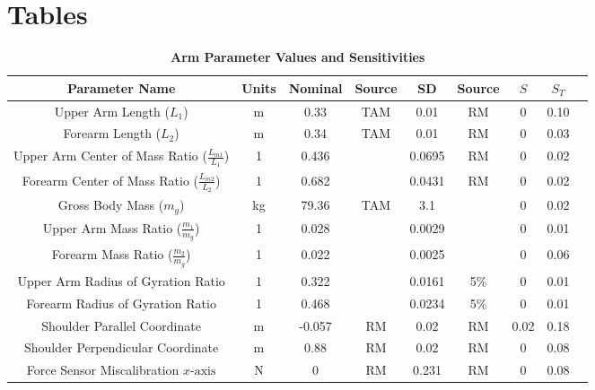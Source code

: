\documentclass[10pt]{article}
\begin{document}
\section*{Tables}

\begin{table}[!ht]
\caption{
\bf{Arm Parameter Values and Sensitivities}}
\begin{tabular}{|c|c|c c|c c|c c|c|}
\hline
Parameter Name &
Units &
Nominal &
Source &
SD &
Source &
$S$ &
$S_T$ \\ \hline
Upper Arm Length ($L_1$) &
m &
0.33 &
TAM &
0.01 &
RM &
0 &
0.10 \\
Forearm Length ($L_2$) &
m &
0.34 &
TAM &
0.01 &
RM &
0 &
0.03 \\
Upper Arm Center of Mass Ratio ($\frac{L_{m1}}{L_1}$) &
1 &
0.436 &
\cite{winter2009biomechanics} &
0.0695 &
RM &
0 &
0.02 \\
Forearm Center of Mass Ratio ($\frac{L_{m2}}{L_2}$) &
1 &
0.682 &
\cite{winter2009biomechanics} &
0.0431 &
RM &
0 &
0.02 \\
Gross Body Mass ($m_g$) &
kg &
79.36 &
TAM &
3.1 &
\cite{stunkard1981accuracy} &
0 &
0.02 \\
Upper Arm Mass Ratio ($\frac{m_1}{m_g}$) &
1 &
0.028 &
\cite{winter2009biomechanics} &
0.0029 &
\cite{dempster1955space} &
0 &
0.01 \\
Forearm Mass Ratio ($\frac{m_2}{m_g}$) &
1 &
0.022 &
\cite{winter2009biomechanics} &
0.0025 &
\cite{dempster1955space} &
0 &
0.06 \\
Upper Arm Radius of Gyration Ratio &
1 &
0.322 &
\cite{winter2009biomechanics} &
0.0161 &
5\% &
0 &
0.01 \\
Forearm Radius of Gyration Ratio &
1 &
0.468 &
\cite{winter2009biomechanics} &
0.0234 &
5\% &
0 &
0.01 \\
Shoulder Parallel Coordinate &
m &
-0.057 &
RM &
0.02 &
RM &
0.02 &
0.18 \\
Shoulder Perpendicular Coordinate &
m &
0.88 &
RM &
0.02 &
RM &
0 &
0.08 \\
Force Sensor Miscalibration $x\text{-axis}$ &
N &
0 &
RM &
0.231 &
RM &
0 &
0.08 \\

\end{tabular}
\end{table}
\end{document}
